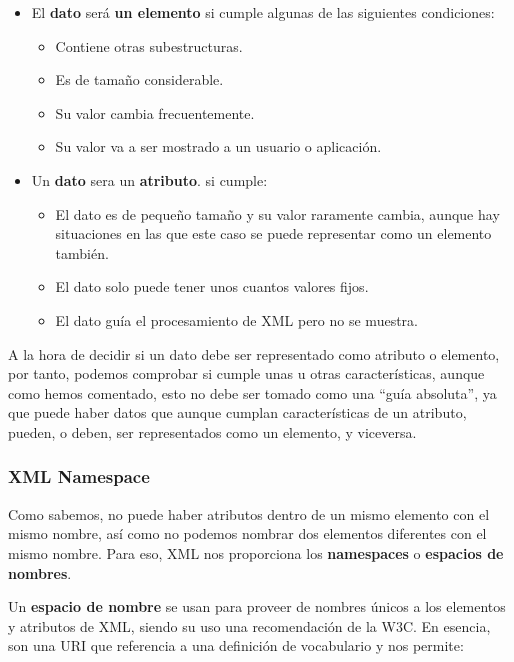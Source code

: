 \begin{itemize}
    \item El \textbf{dato} será \textbf{un elemento} si cumple algunas de las siguientes condiciones:
    \begin{itemize}
        \item Contiene otras subestructuras.
        \item Es de tamaño considerable.
        \item Su valor cambia frecuentemente.
        \item Su valor va a ser mostrado a un usuario o aplicación.
    \end{itemize}

    \item  Un \textbf{dato} sera un \textbf{atributo}. si cumple:
    \begin{itemize}
        \item El dato es de pequeño tamaño y su valor raramente cambia, aunque hay situaciones en las que este caso se puede representar como un elemento también.
        \item El dato solo puede tener unos cuantos valores fijos.
        \item El dato guía el procesamiento de XML pero no se muestra.
    \end{itemize}
\end{itemize}

A la hora de decidir si un dato debe ser representado como atributo o elemento, por tanto, podemos comprobar si cumple unas u otras características, aunque como hemos comentado, esto no debe ser tomado como una ``guía absoluta'', ya que puede haber datos que aunque cumplan características de un atributo, pueden, o deben, ser representados como un elemento, y viceversa.

\subsubsection{XML Namespace}
Como sabemos, no puede haber atributos dentro de un mismo elemento con el mismo nombre, así como no podemos nombrar dos elementos diferentes con el mismo nombre. Para eso, XML nos proporciona los \textbf{namespaces} o \textbf{espacios de nombres}.

Un \textbf{espacio de nombre} se usan para proveer de nombres únicos a los elementos y atributos de XML, siendo su uso una recomendación de la W3C. \cite{namespace} En esencia, son una URI que referencia a una definición de vocabulario y nos permite:

